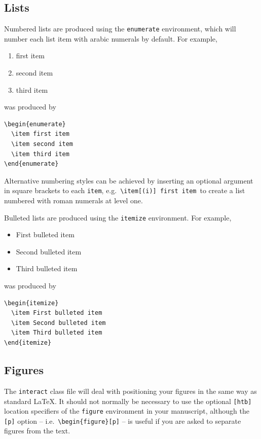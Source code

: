 \documentclass[]{interact}
\theoremstyle{plain}%
\theoremstyle{definition}
\theoremstyle{remark}
\begin{document}
\subsection{Lists}

Numbered lists are produced using the \texttt{enumerate} environment, which will number each list item with arabic numerals by default. For example,
\begin{enumerate}
  \item first item
  \item second item
  \item third item
\end{enumerate}
was produced by
\begin{verbatim}
\begin{enumerate}
  \item first item
  \item second item
  \item third item
\end{enumerate}
\end{verbatim}
Alternative numbering styles can be achieved by inserting an optional argument in square brackets to each \verb"item", e.g.\ \verb"\item[(i)] first item"\, to create a list numbered with roman numerals at level one.

Bulleted lists are produced using the \texttt{itemize} environment. For example,
\begin{itemize}
  \item First bulleted item
  \item Second bulleted item
  \item Third bulleted item
\end{itemize}
was produced by
\begin{verbatim}
\begin{itemize}
  \item First bulleted item
  \item Second bulleted item
  \item Third bulleted item
\end{itemize}
\end{verbatim}


\subsection{Figures}

The \texttt{interact} class file will deal with positioning your figures in the same way as standard \LaTeX. It should not normally be necessary to use the optional \texttt{[htb]} location specifiers of the \texttt{figure} environment in your manuscript, although the \texttt{[p]} option -- i.e.\ \verb"\begin{figure}[p]" -- is useful if you are asked to separate figures from the text.
\end{document}
